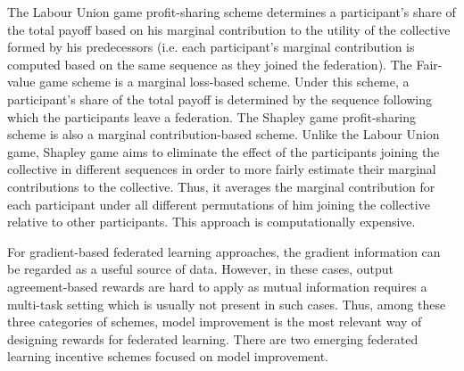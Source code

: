 \documentclass{article}
\begin{document}
The Labour Union game \cite{Gollapudi-et-al:2017} profit-sharing scheme determines a participant's share of the total payoff based on his marginal contribution to the utility of the collective formed by his predecessors (i.e. each participant's marginal contribution is computed based on the same sequence as they joined the federation). The Fair-value game scheme \cite{Gollapudi-et-al:2017} is a marginal loss-based scheme. Under this scheme, a participant's share of the total payoff is determined by the sequence following which the participants leave a federation. The Shapley game profit-sharing scheme \cite{Gollapudi-et-al:2017} is also a marginal contribution-based scheme. Unlike the Labour Union game, Shapley game aims to eliminate the effect of the participants joining the collective in different sequences in order to more fairly estimate their marginal contributions to the collective. Thus, it averages the marginal contribution for each participant under all different permutations of him joining the collective relative to other participants. This approach is computationally expensive.

For gradient-based federated learning approaches, the gradient information can be regarded as a useful source of data. However, in these cases, output agreement-based rewards are hard to apply as mutual information requires a multi-task setting which is usually not present in such cases. Thus, among these three categories of schemes, model improvement is the most relevant way of designing rewards for federated learning. There are two emerging federated learning incentive schemes focused on model improvement.

\end{document}
